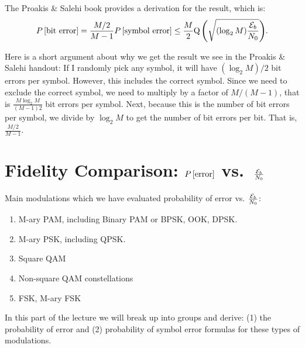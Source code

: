 The Proakis \& Salehi book provides a derivation for the result, which is:
\begin{equation}
    P\left[{\mbox{bit error}}\right] = 
      \frac{M/2}{M-1} P\left[{\mbox{symbol error}}\right] 
    \le 
      \frac{M}{2} {\mbox{Q}\left( { \sqrt{(\log_2 M) \frac{\mathcal{E}_b }{N_0}}} \right)}.
\end{equation}

Here is a short argument about why we get the result we see in the Proakis \& Salehi handout: If I randomly pick any symbol, it will have $(\log_2 M)/2$ bit errors per symbol.  However, this includes the correct symbol.  Since we need to exclude the correct symbol, we need to multiply by a factor of $M/(M-1)$, that is $\frac{M\log_2 M}{(M-1) 2}$ bit errors per symbol.  Next, because this is the number of bit errors per symbol, we divide by $\log_2 M$ to get the number of bit errors per bit.  That is, $\frac{M/2}{M-1}$.


\section{Fidelity Comparison: $P\left[{\mbox{error}}\right]$ vs.~$\frac{\mathcal{E}_b}{N_0}$}


Main modulations which we have evaluated probability of error vs.
$\frac{\mathcal{E}_b}{N_0}$:
\begin{enumerate}
  \item M-ary PAM, including Binary PAM or BPSK, OOK, DPSK.
  \item M-ary PSK, including QPSK.
  \item Square QAM
  \item Non-square QAM constellations
  \item FSK, M-ary FSK
\end{enumerate}

In this part of the lecture we will break up into groups and
derive: (1) the probability of error and (2) probability of symbol
error formulas for these types of modulations.


